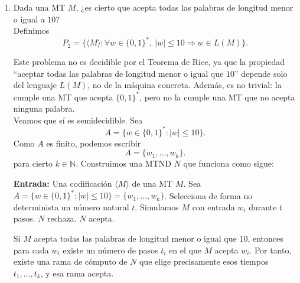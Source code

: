 \documentclass[12pt]{article}
\begin{document}
\begin{ejercicio}[2.4 puntos]
\begin{enumerate}
            Luego $C\text{-PARADA}\propto P_1$. Como $C\text{-PARADA}$ no es
            semidecidible, $P_1$ tampoco es semidecidible. En particular, no es decidible.

            \newpage

            \item Dada una MT $M$, ¿es cierto que acepta todas las palabras de longitud menor o igual a $10$? \\
            
            Definimos
            $$
            P_2=\{\langle M\rangle : \forall w \in \{0,1\}^*,\ |w|\leq 10 \Rightarrow w\in L(M)\}.
            $$

            Este problema no es decidible por el Teorema de Rice, ya que la propiedad
            ``aceptar todas las palabras de longitud menor o igual que $10$'' depende solo del lenguaje $L(M)$,
            no de la máquina concreta. Además, es no trivial: la cumple una MT que acepta $\{0,1\}^*$, pero no la cumple
            una MT que no acepta ninguna palabra. \\

            Veamos que sí es semidecidible. Sea
            $$
            A=\{w\in\{0,1\}^* : |w|\leq 10\}.
            $$
            Como $A$ es finito, podemos escribir
            $$
            A=\{w_1,\dots,w_k\}.
            $$
            para cierto $k \in \mathbb{N}$. Construimos una MTND $N$ que funciona como sigue:

            \begin{algorithm}
            \caption{MTND $N$}
            \label{algorithm:todas-longitud-diez-nd}
                \begin{algorithmic}
                    \State \textbf{Entrada:} Una codificación $\langle M\rangle$ de una MT $M$.
                    \State Sea $A=\{w\in\{0,1\}^* : |w|\leq 10\}=\{w_1,\dots,w_k\}$.
                    \State Selecciona de forma no determinista un número natural $t$.
                        \State Simulamos $M$ con entrada $w_i$ durante $t$ pasos.
                            \State $N$ rechaza.
                        \EndIf
                    \EndFor
                    \State $N$ acepta.
                \end{algorithmic}
            \end{algorithm}

            Si $M$ acepta todas las palabras de longitud menor o igual que $10$, entonces para cada $w_i$
            existe un número de pasos $t_i$ en el que $M$ acepta $w_i$. Por tanto, existe una rama de cómputo
            de $N$ que elige precisamente esos tiempos $t_1,\dots,t_k$, y esa rama acepta. \\


\end{enumerate}
\end{ejercicio}
\end{document}
